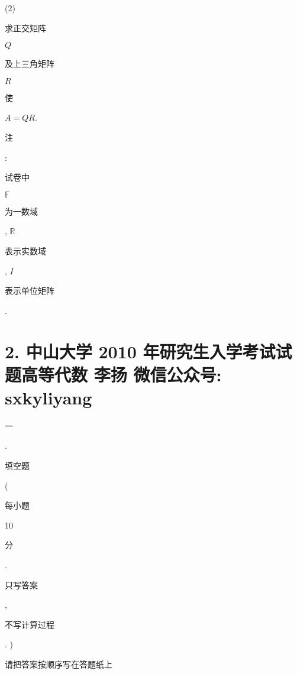 \documentclass[10pt]{article}
\begin{document}
(2) \begin{CJK}{UTF8}{mj}求正交矩阵\end{CJK} $Q$ \begin{CJK}{UTF8}{mj}及上三角矩阵\end{CJK} $R$ \begin{CJK}{UTF8}{mj}使\end{CJK} $A=Q R$.

\begin{CJK}{UTF8}{mj}注\end{CJK}: \begin{CJK}{UTF8}{mj}试卷中\end{CJK} $\mathbb{F}$ \begin{CJK}{UTF8}{mj}为一数域\end{CJK}, $\mathbb{R}$ \begin{CJK}{UTF8}{mj}表示实数域\end{CJK}, $I$ \begin{CJK}{UTF8}{mj}表示单位矩阵\end{CJK}.

\section{2. 中山大学 2010 年研究生入学考试试题高等代数 
 李扬 
 微信公众号: sxkyliyang}
\begin{CJK}{UTF8}{mj}一\end{CJK}. \begin{CJK}{UTF8}{mj}填空题\end{CJK} (\begin{CJK}{UTF8}{mj}每小题\end{CJK} 10 \begin{CJK}{UTF8}{mj}分\end{CJK}. \begin{CJK}{UTF8}{mj}只写答案\end{CJK}, \begin{CJK}{UTF8}{mj}不写计算过程\end{CJK}. ) \begin{CJK}{UTF8}{mj}请把答案按顺序写在答题纸上\end{CJK}
\end{document}
